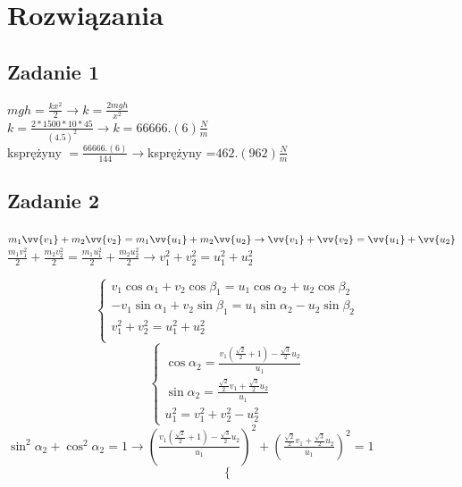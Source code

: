 \documentclass[14pt]{extarticle}
\begin{document}
    \section{Rozwiązania}
    \subsection{Zadanie 1}
    \Large
        \(mgh=\frac{kx^2}{2} \rightarrow k=\frac{2mgh}{x^2}\)\\
        \(k=\frac{2\ast 1500 \ast 10\ast 45}{(4.5)^2} \rightarrow k=66666.(6)\frac{N}{m}\)\\
        k\footnotesize sprężyny \Large\(=\frac{66666.(6)}{144} \rightarrow\)k\footnotesize sprężyny \LARGE=\underline{\(462.(962)\frac{N}{m}\)}
    \subsection{Zadanie 2}
    \large
    $m_1\vv{v_1}+m_2\vv{v_2}=m_1\vv{u_1}+m_2\vv{u_2} \rightarrow \vv{v_1} + \vv{v_2} = \vv{u_1} + \vv{u_2}$\\
    $\frac{m_1v_1^2}{2}+\frac{m_2v_2^2}{2}=\frac{m_1u_1^2}{2}+\frac{m_2u_2^2}{2} \rightarrow v_1^2 + v_2^2 = u_1^2 + u_2^2 $
    
    \begin{equation}
        \begin{cases}
           v_1\cos\alpha _1 + v_2\cos\beta _1 = u_1\cos\alpha _2 + u_2\cos\beta _2 &\\
            -v_1\sin\alpha _1 + v_2\sin\beta _1 = u_1\sin\alpha _2 - u_2\sin\beta _2 &\\
           v_1^2 + v_2^2 = u_1^2 + u_2^2 &\\
        \end{cases}
    \end{equation}
    \begin{equation}
        \begin{cases}
            \cos\alpha _2 = \frac{v_1(\frac{\sqrt{2}}{2}+1)-\frac{\sqrt{3}}{2}u_2}{u_1}&\\
            \sin\alpha _2 = \frac{\frac{\sqrt{2}}{2}v_1+\frac{\sqrt{3}}{2}u_2}{u_1}&\\
            u_1^2 = v_1^2 + v_2^2 - u_2^2&
        \end{cases}
    \end{equation}
    $\sin^2\alpha _2 + \cos^2\alpha _2 = 1 \rightarrow 
    \left(\frac{v_1(\frac{\sqrt{2}}{2}+1)-\frac{\sqrt{3}}{2}u_2}{u_1}\right)^2 + \left(\frac{\frac{\sqrt{2}}{2}v_1+\frac{\sqrt{3}}{2}u_2}{u_1}\right)^2 = 1$
    \begin{equation}
        \begin{cases}
            
        \end{cases}
    \end{equation}
        
            
\end{document}

